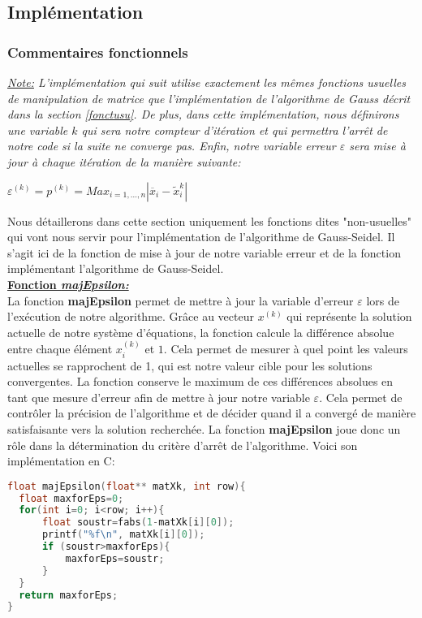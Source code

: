 \documentclass{report}
\begin{document}
\subsection{Implémentation}
\subsubsection{Commentaires fonctionnels}
\textit{\underline{Note:} L'implémentation qui suit utilise exactement les mêmes fonctions usuelles de manipulation de matrice que l'implémentation de l'algorithme de Gauss décrit dans la section \ref{fonctusu}. De plus, dans cette implémentation, nous définirons une variable $k$ qui sera notre compteur d'itération et qui permettra l'arrêt de notre code si la suite ne converge pas. Enfin, notre variable erreur $\varepsilon$ sera mise à jour à chaque itération de la manière suivante:\\}
\begin{center}
  $\varepsilon^{(k)}=p^{(k)}=Max_{i=1,...,n}|\overline{x}_i-\widetilde{x}_i^k|$
\end{center}\vspace{8pt}
Nous détaillerons dans cette section uniquement les fonctions dites "non-usuelles" qui vont nous servir pour l'implémentation de l'algorithme de Gauss-Seidel. Il s'agit ici de la fonction de mise à jour de notre variable erreur et de la fonction implémentant l'algorithme de Gauss-Seidel.\vspace{8pt}\\
\textbf{\underline{Fonction \textit{majEpsilon:}}}\vspace{6pt}\\
La fonction \textbf{majEpsilon} permet de mettre à jour la variable d'erreur $\varepsilon$ lors de l'exécution de notre algorithme. Grâce au vecteur $x^{(k)}$ qui représente la solution actuelle de notre système d'équations, la fonction calcule la différence absolue entre chaque élément $x_i^{(k)}$ et $1$. Cela permet de mesurer à quel point les valeurs actuelles se rapprochent de 1, qui est notre valeur cible pour les solutions convergentes. La fonction conserve le maximum de ces différences absolues en tant que mesure d'erreur afin de mettre à jour notre variable $\varepsilon$. Cela permet de contrôler la précision de l'algorithme et de décider quand il a convergé de manière satisfaisante vers la solution recherchée. La fonction \textbf{majEpsilon} joue donc un rôle dans la détermination du critère d'arrêt de l'algorithme. Voici son implémentation en C:
\begin{lstlisting}[language=C,inputencoding=utf8, basicstyle=\fontsize{8}{10}\selectfont]
float majEpsilon(float** matXk, int row){
  float maxforEps=0;
  for(int i=0; i<row; i++){
      float soustr=fabs(1-matXk[i][0]);
      printf("%f\n", matXk[i][0]);
      if (soustr>maxforEps){
          maxforEps=soustr;
      }
  }
  return maxforEps;
}
\end{lstlisting}
\end{document}
